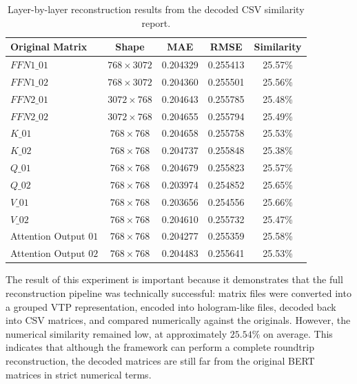 \documentclass{article}
\begin{document}
\begin{normalsize}
\begin{table}[H]
\centering
\scriptsize
\begin{tabular}{|l|c|c|c|c|}
\hline
\textbf{Original Matrix} & \textbf{Shape} & \textbf{MAE} & \textbf{RMSE} & \textbf{Similarity} \\
\hline
\(FFN1\_01\) & \(768 \times 3072\) & 0.204329 & 0.255413 & 25.57\% \\
\hline
\(FFN1\_02\) & \(768 \times 3072\) & 0.204360 & 0.255501 & 25.56\% \\
\hline
\(FFN2\_01\) & \(3072 \times 768\) & 0.204643 & 0.255785 & 25.48\% \\
\hline
\(FFN2\_02\) & \(3072 \times 768\) & 0.204655 & 0.255794 & 25.49\% \\
\hline
\(K\_01\) & \(768 \times 768\) & 0.204658 & 0.255758 & 25.53\% \\
\hline
\(K\_02\) & \(768 \times 768\) & 0.204737 & 0.255848 & 25.38\% \\
\hline
\(Q\_01\) & \(768 \times 768\) & 0.204679 & 0.255823 & 25.57\% \\
\hline
\(Q\_02\) & \(768 \times 768\) & 0.203974 & 0.254852 & 25.65\% \\
\hline
\(V\_01\) & \(768 \times 768\) & 0.203656 & 0.254556 & 25.66\% \\
\hline
\(V\_02\) & \(768 \times 768\) & 0.204610 & 0.255732 & 25.47\% \\
\hline
Attention Output \(01\) & \(768 \times 768\) & 0.204277 & 0.255359 & 25.58\% \\
\hline
Attention Output \(02\) & \(768 \times 768\) & 0.204483 & 0.255641 & 25.53\% \\
\hline
\end{tabular}
\caption{Layer-by-layer reconstruction results from the decoded CSV similarity report.}
\label{tab:full_matrix_roundtrip_details}
\end{table}

The result of this experiment is important because it demonstrates that the full reconstruction pipeline was technically successful: matrix files were converted into a grouped VTP representation, encoded into hologram-like files, decoded back into CSV matrices, and compared numerically against the originals. However, the numerical similarity remained low, at approximately \(25.54\%\) on average. This indicates that although the framework can perform a complete roundtrip reconstruction, the decoded matrices are still far from the original BERT matrices in strict numerical terms.


\end{normalsize}
\end{document}
